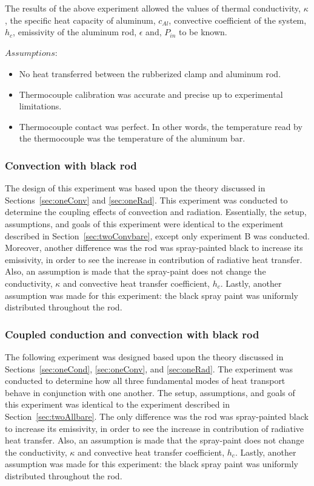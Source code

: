 \documentclass[10pt,aps,prb,twocolumn, nofootinbib]{revtex4-1}
\begin{document}
The results of the above experiment allowed the values of thermal conductivity, $\kappa$, the specific heat capacity of aluminum, $c_{Al}$, convective coefficient of the system, $h_c$, emissivity of the aluminum rod, $\epsilon$ and, $P_{in}$ to be known.

\bigskip
 \noindent $\underline{Assumptions:}$
 
 \begin{itemize}\parskip0pt
    	\item No heat transferred between the rubberized clamp and aluminum rod.
    	\medskip
    	\item Thermocouple calibration was accurate and precise up to experimental limitations.
    	\medskip
    	\item Thermocouple contact was perfect. In other words, the temperature read by the thermocouple was the temperature of the aluminum bar.
    	\medskip
 \end{itemize} 

\subsubsection{\label{sec:twoConvblack} Convection with black rod}
The design of this experiment was based upon the theory discussed in Sections~\ref{sec:oneConv} and \ref{sec:oneRad}. This experiment was conducted to determine the coupling effects of convection and radiation. Essentially, the setup, assumptions, and goals of this experiment were identical to the experiment described in Section~\ref{sec:twoConvbare}, except only experiment B was conducted. Moreover, another difference was the rod was spray-painted black to increase its emissivity, in order to see the increase in contribution of radiative heat transfer. Also, an assumption is made that the spray-paint does not change the conductivity, $\kappa$ and convective heat transfer coefficient, $h_c$. Lastly, another assumption was made for this experiment: the black spray paint was uniformly distributed throughout the rod. 

\subsubsection{\label{sec:twoAllblack} Coupled conduction and convection with black rod}
The following experiment was designed based upon the theory discussed in Sections~\ref{sec:oneCond}, \ref{sec:oneConv}, and \ref{sec:oneRad}. The experiment was conducted to determine how all three fundamental modes of heat transport behave in conjunction with one another. The setup, assumptions, and goals of this experiment was identical to the experiment described in Section~\ref{sec:twoAllbare}. The only difference was the rod was spray-painted black to increase its emissivity, in order to see the increase in contribution of radiative heat transfer. Also, an assumption is made that the spray-paint does not change the conductivity, $\kappa$ and convective heat transfer coefficient, $h_c$. Lastly, another assumption was made for this experiment: the black spray paint was uniformly distributed throughout the rod. 
\end{document}
